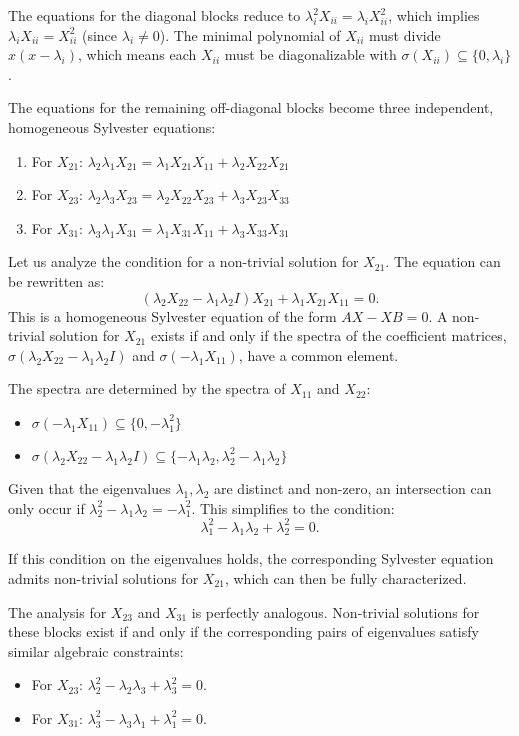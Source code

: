 \documentclass{article}
\begin{document}
The equations for the diagonal blocks reduce to $\lambda_i^2 X_{ii} = \lambda_i X_{ii}^2$, which implies $\lambda_i X_{ii} = X_{ii}^2$ (since $\lambda_i \neq 0$). The minimal polynomial of $X_{ii}$ must divide $x(x-\lambda_i)$, which means each $X_{ii}$ must be diagonalizable with $\sigma(X_{ii}) \subseteq \{0, \lambda_i\}$.

The equations for the remaining off-diagonal blocks become three independent, homogeneous Sylvester equations:
\begin{enumerate}
    \item For $X_{21}$: $\lambda_2 \lambda_1 X_{21} = \lambda_1 X_{21} X_{11} + \lambda_2 X_{22} X_{21}$
    \item For $X_{23}$: $\lambda_2 \lambda_3 X_{23} = \lambda_2 X_{22} X_{23} + \lambda_3 X_{23} X_{33}$
    \item For $X_{31}$: $\lambda_3 \lambda_1 X_{31} = \lambda_1 X_{31} X_{11} + \lambda_3 X_{33} X_{31}$
\end{enumerate}

Let us analyze the condition for a non-trivial solution for $X_{21}$. The equation can be rewritten as:
\[
(\lambda_2 X_{22} - \lambda_1 \lambda_2 I) X_{21} + \lambda_1 X_{21} X_{11} = 0.
\]
This is a homogeneous Sylvester equation of the form $AX - XB = 0$. A non-trivial solution for $X_{21}$ exists if and only if the spectra of the coefficient matrices, $\sigma(\lambda_2 X_{22} - \lambda_1 \lambda_2 I)$ and $\sigma(-\lambda_1 X_{11})$, have a common element.

The spectra are determined by the spectra of $X_{11}$ and $X_{22}$:
\begin{itemize}
    \item $\sigma(-\lambda_1 X_{11}) \subseteq \{0, -\lambda_1^2\}$
    \item $\sigma(\lambda_2 X_{22} - \lambda_1 \lambda_2 I) \subseteq \{-\lambda_1 \lambda_2, \lambda_2^2 - \lambda_1 \lambda_2\}$
\end{itemize}

Given that the eigenvalues $\lambda_1, \lambda_2$ are distinct and non-zero, an intersection can only occur if $\lambda_2^2 - \lambda_1 \lambda_2 = - \lambda_1^2$. This simplifies to the condition:
\[
\lambda_1^2 - \lambda_1 \lambda_2 + \lambda_2^2 = 0.
\]

If this condition on the eigenvalues holds, the corresponding Sylvester equation admits non-trivial solutions for $X_{21}$, which can then be fully characterized.

The analysis for $X_{23}$ and $X_{31}$ is perfectly analogous. Non-trivial solutions for these blocks exist if and only if the corresponding pairs of eigenvalues satisfy similar algebraic constraints:
\begin{itemize}
    \item For $X_{23}$: $\lambda_2^2 - \lambda_2 \lambda_3 + \lambda_3^2 = 0$.
    \item For $X_{31}$: $\lambda_3^2 - \lambda_3 \lambda_1 + \lambda_1^2 = 0$.
\end{itemize}
\end{document}
